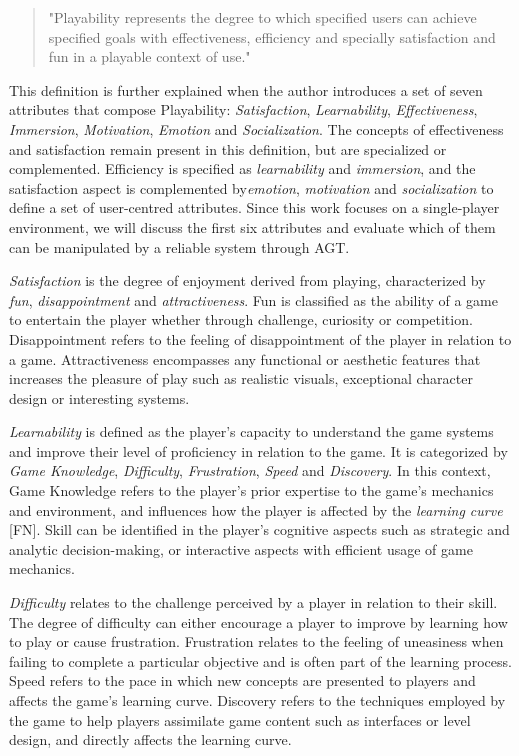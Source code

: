 \begin{quotation}
"Playability represents the degree to which specified users can achieve specified goals with effectiveness, efficiency and specially satisfaction and fun in a playable context of use."
\end{quotation}

This definition is further explained when the author introduces a set of seven attributes that compose Playability: \emph{Satisfaction}, \emph{Learnability}, \emph{Effectiveness}, \emph{Immersion}, \emph{Motivation}, \emph{Emotion} and \emph{Socialization}. The concepts of effectiveness and satisfaction remain present in this definition, but are specialized or complemented. Efficiency is specified as \emph{learnability} and \emph{immersion}, and the satisfaction aspect is complemented by\emph{emotion}, \emph{motivation} and \emph{socialization} to define a set of user-centred attributes. Since this work focuses on a single-player environment, we will discuss the first six attributes and evaluate which of them can be manipulated by a reliable system through AGT.

\emph{Satisfaction} is the degree of enjoyment derived from playing, characterized by \emph{fun}, \emph{disappointment} and \emph{attractiveness}. Fun is classified as the ability of a game to entertain the player whether through challenge, curiosity or competition. Disappointment refers to the feeling of disappointment of the player in relation to a game. Attractiveness encompasses any functional or aesthetic features that increases the pleasure of play such as realistic visuals, exceptional character design or interesting systems.

\emph{Learnability} is defined as the player's capacity to understand the game systems and improve their level of proficiency in relation to the game. It is categorized by \emph{Game Knowledge}, \emph{Difficulty}, \emph{Frustration}, \emph{Speed} and \emph{Discovery}. In this context, Game Knowledge refers to the player's prior expertise to the game's mechanics and environment, and influences how the player is affected by the \emph{learning curve} [FN]. Skill can be identified in the player's cognitive aspects such as strategic and analytic decision-making, or interactive aspects with efficient usage of game mechanics.

\emph{Difficulty} relates to the challenge perceived by a player in relation to their skill. The degree of difficulty can either encourage a player to improve by learning how to play or cause frustration. Frustration relates to the feeling of uneasiness when failing to complete a particular objective and is often part of the learning process. Speed refers to the pace in which new concepts are presented to players and affects the game's learning curve. Discovery refers to the techniques employed by the game to help players assimilate game content such as interfaces or level design, and directly affects the learning curve.

